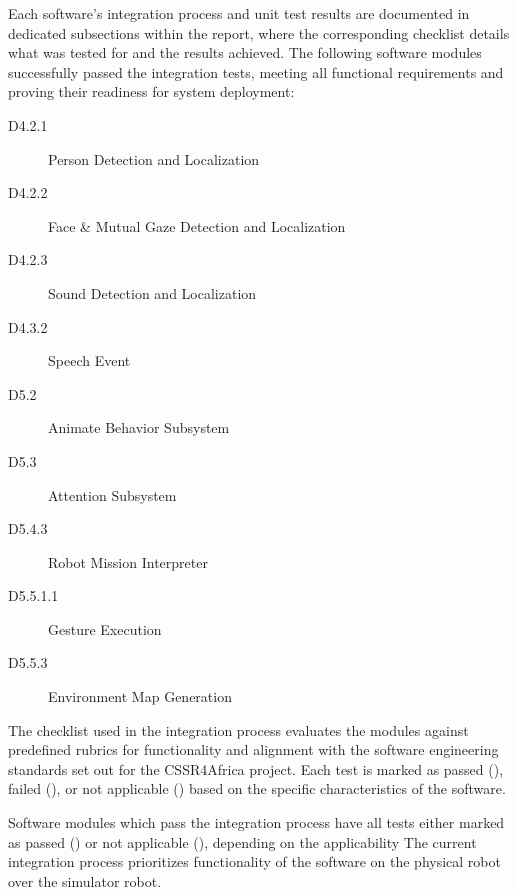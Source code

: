 \documentclass{CSSRforAfrica}
\newcommand{\checkboxChecked}{\fbox{\ding{51}}} %
\newcommand{\checkboxCrossed}{\fbox{\ding{55}}} %
\newcommand{\checkboxDashed}{\fbox{--}}         %
\begin{document}
\noindent Each software's integration process and unit test results are documented in dedicated subsections within the report, where the corresponding checklist details what was tested for and the results achieved.
The following software modules successfully passed the integration tests, meeting all functional requirements and proving their readiness for system deployment:
\begin{description}
    \item[D4.2.1] Person Detection and Localization
    \item[D4.2.2] Face \& Mutual Gaze Detection and Localization
    \item[D4.2.3] Sound Detection and Localization
    \item[D4.3.2] Speech Event
    \item[D5.2] Animate Behavior Subsystem
    \item[D5.3] Attention Subsystem
    \item[D5.4.3] Robot Mission Interpreter
    \item[D5.5.1.1] Gesture Execution
    \item[D5.5.3] Environment Map Generation
\end{description}



\noindent The checklist used in the integration process evaluates the modules against predefined rubrics for functionality and alignment with the software engineering standards set out for the CSSR4Africa project. Each test is marked as passed (\checkboxChecked), failed (\checkboxCrossed), or not applicable (\checkboxDashed) based on the specific characteristics of the software. 

\noindent Software modules which pass the integration process have all tests either marked as passed (\checkboxChecked) or not applicable (\checkboxDashed), depending on the applicability
The current integration process prioritizes functionality of the software on the physical robot over the simulator robot.
\end{document}

